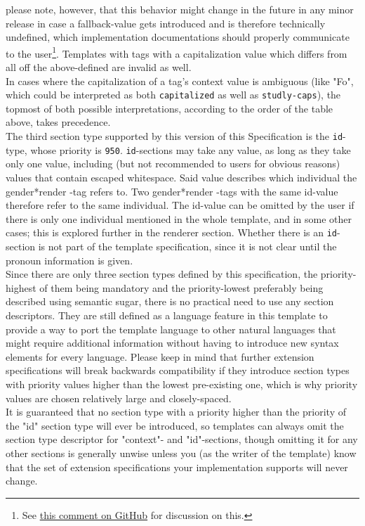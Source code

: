 \documentclass{article}
\newcommand{\GenderRender}{
    gender*render
}
\begin{document}
    please note, however, that this behavior might change in the future in any minor release in case a fallback-value gets introduced and is therefore technically undefined, which implementation documentations should properly communicate to the user\footnote{See \href{https://github.com/phseiff/gender-render/issues/2\#issuecomment-798799367}{this comment on GitHub} for discussion on this.}.
    Templates with tags with a capitalization value which differs from all off the above-defined are invalid as well.\\
    In cases where the capitalization of a tag's context value is ambiguous (like "Fo", which could be interpreted as both \texttt{capitalized} as well as \texttt{studly-caps}), the topmost of both possible interpretations, according to the order of the table above, takes precedence.\\

    The third section type supported by this version of this Specification is the \texttt{id}-type, whose priority is \texttt{950}.
    \texttt{id}-sections may take any value, as long as they take only one value, including (but not recommended to users for obvious reasons) values that contain escaped whitespace.
    Said value describes which individual the \GenderRender-tag refers to.
    Two \GenderRender-tags with the same id-value therefore refer to the same individual.
    The id-value can be omitted by the user if there is only one individual mentioned in the whole template, and in some other cases;
    this is explored further in the renderer section.
    Whether there is an \texttt{id}-section is not part of the template specification, since it is not clear until the pronoun information is given.\\

    Since there are only three section types defined by this specification, the priority-highest of them being mandatory and the priority-lowest preferably being described using semantic sugar, there is no practical need to use any section descriptors.
    They are still defined as a language feature in this template to provide a way to port the template language to other natural languages that might require additional information without having to introduce new syntax elements for every language.
    Please keep in mind that further extension specifications will break backwards compatibility if they introduce section types with priority values higher than the lowest pre-existing one, which is why priority values are chosen relatively large and closely-spaced.\\
    It is guaranteed that no section type with a priority higher than the priority of the "id" section type will ever be introduced, so templates can always omit the section type descriptor for "context"- and "id"-sections, though omitting it for any other sections is generally unwise unless you (as the writer of the template) know that the set of extension specifications your implementation supports will never change.\\
\end{document}

